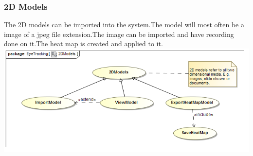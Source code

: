 	\subsubsection{2D Models}
	The 2D models can be imported into the system.The model will most often be a image of a jpeg file extension.The image can be imported and have recording done on it.The heat map is created and applied to it.
	\newline
		\includegraphics[scale=0.5]{Diagrams/Use_Case_Diagram__2DModels.png}
		
